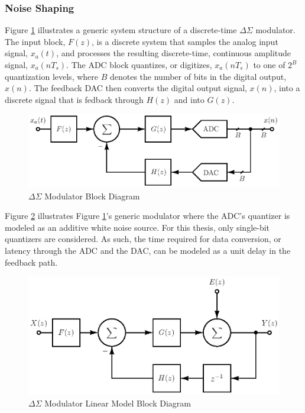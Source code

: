 \subsubsection{Noise Shaping}
Figure \ref{fig:linear_block_diagram} illustrates a generic system structure of a
discrete-time $\Delta\Sigma$ modulator. The input block, $F(z)$, is a discrete system that
samples the analog input signal, $x_a(t)$, and processes the resulting discrete-time,
continuous amplitude signal, $x_a(n T_s)$. The ADC
block quantizes, or digitizes, $x_a(n T_s)$ to one of $2^B$ quantization levels, 
where $B$ denotes the number of bits in the digital output, $x(n)$. The
feedback DAC then converts the digital output signal, $x(n)$, into a discrete signal that
is fedback through $H(z)$ and into $G(z)$.
\begin{figure}[htbp]
	\centering
	\includegraphics{./final_figures/linear_block_diagram.eps}
	\caption{$\Delta\Sigma$ Modulator Block Diagram}
	\label{fig:linear_block_diagram}
\end{figure}

Figure \ref{fig:linear_simulation_model} illustrates Figure
\ref{fig:linear_block_diagram}'s generic \DS modulator where the ADC's quantizer is
modeled as an additive white noise source. For this thesis, only single-bit quantizers are
considered. As such, the time required for data conversion, or latency through the ADC and
the DAC, can be modeled as a unit delay in the feedback path.
\begin{figure}[htbp]
	\centering
	\includegraphics{./final_figures/linear_block_simulation.eps}
	\caption{$\Delta\Sigma$ Modulator Linear Model Block Diagram}
	\label{fig:linear_simulation_model}
\end{figure}

